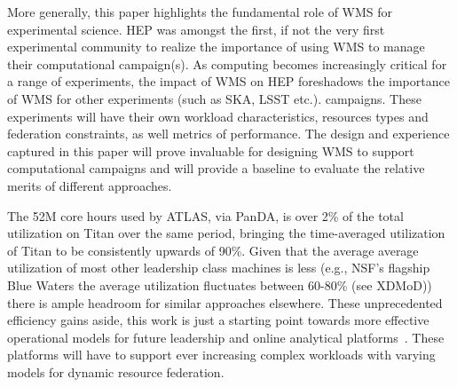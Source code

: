 More generally, this paper highlights the fundamental role of WMS for
experimental science. HEP was amongst the first, if not the very first
experimental community to realize the importance of using WMS to manage their
computational campaign(s). As computing becomes increasingly critical for a
range of experiments, the impact of WMS on HEP foreshadows the importance of
WMS for other experiments (such as SKA, LSST etc.). %
campaigns. These experiments will have their own workload characteristics,
resources types and federation constraints, as well metrics of performance.
The design and experience captured in this paper will prove invaluable for
designing WMS to support computational campaigns and will provide a baseline
to evaluate the relative merits of different approaches.

The 52M core hours used by ATLAS, via PanDA, is over 2\% of the total
utilization on Titan over the same period, bringing the time-averaged
utilization of Titan to be consistently upwards of 90\%. Given that the
average average utilization of most other leadership class machines is less
(e.g., NSF's flagship Blue Waters the average utilization fluctuates between
60-80\% (see XDMoD\cite{bw-sucks})) there is ample headroom for similar
approaches elsewhere. These unprecedented efficiency gains aside, this work is
just a starting point towards more effective operational models for future
leadership and online analytical platforms~\cite{foap-url}. These platforms
will have to support ever increasing complex workloads with varying models for
dynamic resource federation. 

